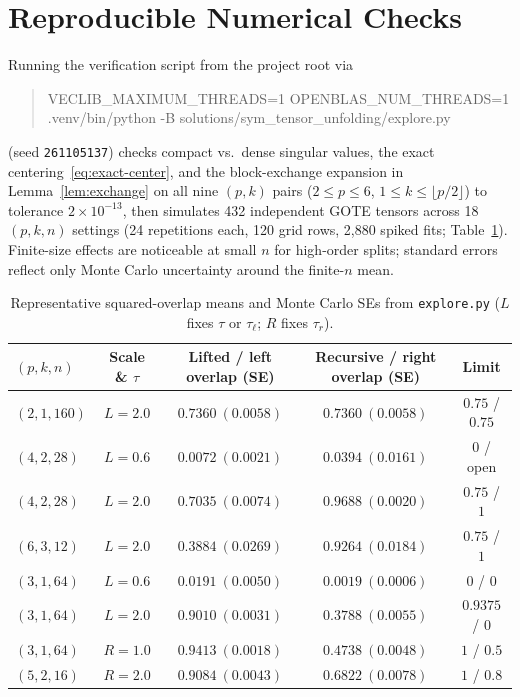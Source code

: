 \documentclass[11pt]{article}
\theoremstyle{plain}
\theoremstyle{definition}
\theoremstyle{remark}
\begin{document}
\section{Reproducible Numerical Checks}

Running the verification script from the project root via
\begin{quote}\small\ttfamily
VECLIB\_MAXIMUM\_THREADS=1 OPENBLAS\_NUM\_THREADS=1\\
.venv/bin/python -B solutions/sym\_tensor\_unfolding/explore.py
\end{quote}
(seed \texttt{261105137}) checks compact vs.\ dense singular values, the exact centering~\eqref{eq:exact-center}, and the block-exchange expansion in Lemma~\ref{lem:exchange} on all nine $(p, k)$ pairs ($2 \le p \le 6$, $1 \le k \le \lfloor p/2 \rfloor$) to tolerance $2 \times 10^{-13}$, then simulates 432 independent GOTE tensors across 18 $(p, k, n)$ settings (24 repetitions each, 120 grid rows, 2,880 spiked fits; Table~\ref{tab:checks}). Finite-size effects are noticeable at small $n$ for high-order splits; standard errors reflect only Monte Carlo uncertainty around the finite-$n$ mean.

\begin{table}[htbp]
\centering
\small
\begin{tabular}{@{}lcccc@{}}
\toprule
$(p, k, n)$ & Scale \& $\tau$ & Lifted / left overlap (SE) & Recursive / right overlap (SE) & Limit \\
\midrule
$(2, 1, 160)$ & $L = 2.0$ & $0.7360\ (0.0058)$ & $0.7360\ (0.0058)$ & $0.75$ / $0.75$ \\
$(4, 2, 28)$  & $L = 0.6$ & $0.0072\ (0.0021)$ & $0.0394\ (0.0161)$ & $0$ / open \\
$(4, 2, 28)$  & $L = 2.0$ & $0.7035\ (0.0074)$ & $0.9688\ (0.0020)$ & $0.75$ / $1$ \\
$(6, 3, 12)$  & $L = 2.0$ & $0.3884\ (0.0269)$ & $0.9264\ (0.0184)$ & $0.75$ / $1$ \\
$(3, 1, 64)$  & $L = 0.6$ & $0.0191\ (0.0050)$ & $0.0019\ (0.0006)$ & $0$ / $0$ \\
$(3, 1, 64)$  & $L = 2.0$ & $0.9010\ (0.0031)$ & $0.3788\ (0.0055)$ & $0.9375$ / $0$ \\
$(3, 1, 64)$  & $R = 1.0$ & $0.9413\ (0.0018)$ & $0.4738\ (0.0048)$ & $1$ / $0.5$ \\
$(5, 2, 16)$  & $R = 2.0$ & $0.9084\ (0.0043)$ & $0.6822\ (0.0078)$ & $1$ / $0.8$ \\
\bottomrule
\end{tabular}
\caption{Representative squared-overlap means and Monte Carlo SEs from \texttt{explore.py} ($L$ fixes $\tau$ or $\tau_\ell$; $R$ fixes $\tau_r$).}
\label{tab:checks}
\end{table}
\end{document}

